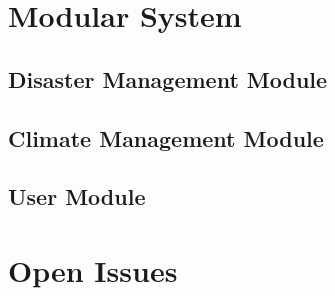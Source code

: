 \documentclass[a4paper,12pt]{article}
\begin{document}
	\section{Modular System}	
		
		\subsection{Disaster Management Module}
			

		\subsection{Climate Management Module}
			
		
		\subsection{User Module}
		 
			
	\section{Open Issues}
	
	
	
\end{document}
